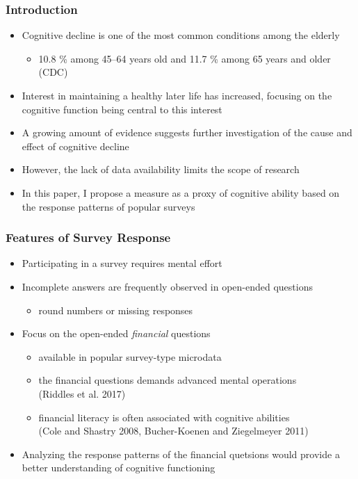 \documentclass[10pt,svgnames,fragile]{beamer}
\begin{document}
	
	\begin{frame}
		\frametitle{Introduction}
			\vfill
		\begin{itemize}
			\item Cognitive decline is one of the most common conditions among the elderly
			\begin{itemize}
				\item 10.8 \% among 45--64 years old and 11.7 \% among 65 years and older (CDC)
			\end{itemize}
			\vfill
			\item Interest in maintaining a healthy later life has increased, focusing on the cognitive function being central to this interest
			\vfill
	

			\vfill
			\item A growing amount of evidence suggests further investigation of the cause and effect of cognitive decline
			\vfill
			\item  However, the lack of data availability limits the scope of research
			\vfill
			\item In this paper, I propose a measure as a proxy of cognitive ability based on the response patterns of popular surveys
			\vfill		
		\end{itemize}
	\end{frame}


\begin{frame}
	\frametitle{Features of Survey Response}
	\begin{itemize}
		\item Participating in a survey requires mental effort %
			\vfill		
	   \item Incomplete answers are frequently observed in open-ended questions
	   \begin{itemize}
	   		\vfill		
	   	\item round numbers or missing responses
	   \end{itemize}
			\vfill		
		\item Focus on the open-ended \textit{financial} questions
		\begin{itemize}
				\vfill		
			\item available in popular survey-type microdata
				\vfill		
			\item the financial questions demands advanced mental operations \\(Riddles et al. 2017)
				\vfill		
			\item financial literacy is often associated with cognitive abilities \\(Cole and Shastry 2008, Bucher-Koenen and Ziegelmeyer 2011)
		\end{itemize}
		\vfill		
		\item Analyzing the response patterns of the financial quetsions would provide a better understanding of cognitive functioning
	\end{itemize}
\end{frame}
\end{document}
